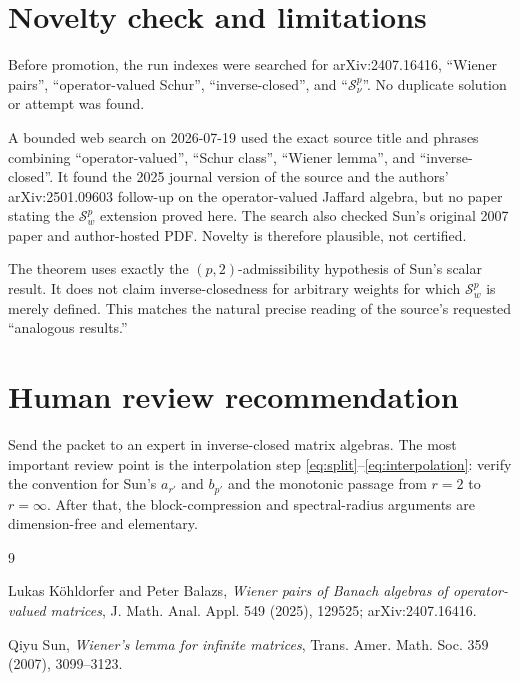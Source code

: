 \documentclass[11pt]{article}
\begin{document}
\section*{Novelty check and limitations}

Before promotion, the run indexes were searched for arXiv:2407.16416,
``Wiener pairs'', ``operator-valued Schur'', ``inverse-closed'', and
``$\mathcal S^p_\nu$''.  No duplicate solution or attempt was found.

A bounded web search on 2026-07-19 used the exact source title and phrases
combining ``operator-valued'', ``Schur class'', ``Wiener lemma'', and
``inverse-closed''.  It found the 2025 journal version of the source and the
authors' arXiv:2501.09603 follow-up on the operator-valued Jaffard algebra,
but no paper stating the $\mathcal S^p_w$ extension proved here.  The search
also checked Sun's original 2007 paper and author-hosted PDF.  Novelty is
therefore plausible, not certified.

The theorem uses exactly the $(p,2)$-admissibility hypothesis of Sun's scalar
result.  It does not claim inverse-closedness for arbitrary weights for which
$\mathcal S^p_w$ is merely defined.  This matches the natural precise reading
of the source's requested ``analogous results.''

\section*{Human review recommendation}

Send the packet to an expert in inverse-closed matrix algebras.  The most
important review point is the interpolation step
\eqref{eq:split}--\eqref{eq:interpolation}: verify the convention for Sun's
$a_{r'}$ and $b_{p'}$ and the monotonic passage from $r=2$ to $r=\infty$.
After that, the block-compression and spectral-radius arguments are
dimension-free and elementary.

\begin{thebibliography}{9}

Lukas K\"ohldorfer and Peter Balazs,
\emph{Wiener pairs of Banach algebras of operator-valued matrices},
J. Math. Anal. Appl. 549 (2025), 129525;
arXiv:2407.16416.

Qiyu Sun,
\emph{Wiener's lemma for infinite matrices},
Trans. Amer. Math. Soc. 359 (2007), 3099--3123.

\end{thebibliography}
\end{document}
